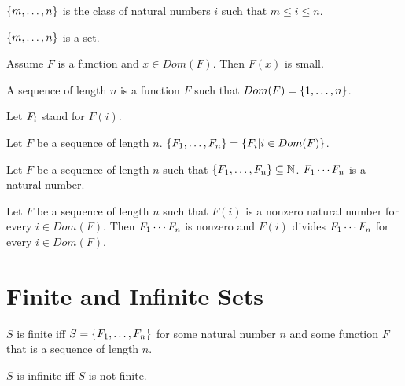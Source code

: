 \documentclass[11pt]{article}
\begin{document}
\begin{forthel}
\begin{definition} $\{m,\dots,n\}$ is the class of
natural numbers $i$ such that $m \leq i \leq n$.
\end{definition}

\begin{axiom} $\{m,\dots,n\}$ is a set. \end{axiom}

\begin{axiom}
Assume $F$ is a function and $x \in Dom(F)$. Then $F(x)$ is small.
\end{axiom}

\begin{definition} A sequence of length $n$ is a
function $F$ such that $Dom(F) = \{1,\dots,n\}$.
\end{definition}

Let $F_{i}$ stand for $F(i)$.

\begin{definition} Let $F$ be a sequence of length $n$.
$\{F_{1},\dots,F_{n}\} = \{ F_{i} | i \in Dom(F)\}$.
\end{definition}

\begin{signature} Let $F$ be a sequence of length $n$
such that $\{F_{1},\dots,F_{n}\} \subseteq \mathbb{N}$.
$F_{1} \cdots F_{n}$ is a natural number.
\end{signature}

\begin{axiom}[Factorproperty] Let $F$ be a sequence of length $n$
such that $F(i)$ is a nonzero natural number for every $i \in Dom(F)$.
Then $F_{1} \cdots F_{n}$ is nonzero and 
$F(i)$ divides $F_{1} \cdots F_{n}$ for every $i \in Dom(F)$.
\end{axiom}


\end{forthel}

\section{Finite and Infinite Sets}

\begin{forthel}

\begin{definition} $S$ is finite iff 
$S = \{F_{1},\dots,F_{n}\}$ for some natural number $n$ and some function $F$ that is 
a sequence of length $n$.
\end{definition}

\begin{definition} $S$ is infinite iff $S$ is not finite.
\end{definition}

\end{forthel}
\end{document}
